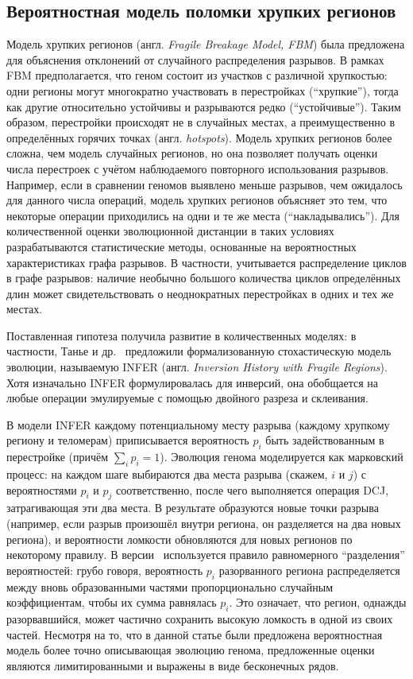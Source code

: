 \subsection{Вероятностная модель поломки хрупких регионов}
\label{subsec:fragile_breakage}

Модель хрупких регионов (англ. \textit{Fragile Breakage Model, FBM}) была предложена для объяснения отклонений от случайного распределения разрывов.
В рамках FBM предполагается, что геном состоит из участков с различной хрупкостью: одни регионы могут многократно участвовать в перестройках (``хрупкие''), тогда как другие относительно устойчивы и разрываются редко (``устойчивые'').
Таким образом, перестройки происходят не в случайных местах, а преимущественно в определённых горячих точках (англ. \textit{hotspots}).
Модель хрупких регионов более сложна, чем модель случайных регионов, но она позволяет получать оценки числа перестроек с учётом наблюдаемого повторного использования разрывов.
Например, если в сравнении геномов выявлено меньше разрывов, чем ожидалось для данного числа операций, модель хрупких регионов объясняет это тем, что некоторые операции приходились на одни и те же места (``накладывались'').
Для количественной оценки эволюционной дистанции в таких условиях разрабатываются статистические методы, основанные на вероятностных характеристиках графа разрывов.
В частности, учитывается распределение циклов в графе разрывов: наличие необычно большого количества циклов определённых длин может свидетельствовать о неоднократных перестройках в одних и тех же местах.


Поставленная гипотеза получила развитие в количественных моделях: в частности, Танье и др.~\cite{tannier2016} предложили формализованную стохастическую модель эволюции, называемую INFER (англ. \textit{Inversion History with Fragile Regions}).
Хотя изначально INFER формулировалась для инверсий, она обобщается на любые операции эмулируемые с помощью двойного разреза и склеивания.

В модели INFER каждому потенциальному месту разрыва (каждому хрупкому региону и теломерам) приписывается вероятность $p_i$ быть задействованным в перестройке (причём $\sum_i p_i = 1$).
Эволюция генома моделируется как марковский процесс: на каждом шаге выбираются два места разрыва (скажем, $i$ и $j$) с вероятностями $p_i$ и $p_j$ соответственно, после чего выполняется операция DCJ, затрагивающая эти два места.
В результате образуются новые точки разрыва (например, если разрыв произошёл внутри региона, он разделяется на два новых региона), и вероятности ломкости обновляются для новых регионов по некоторому правилу.
В версии~\cite{tannier2016} используется правило равномерного ``разделения'' вероятностей: грубо говоря, вероятность $p_i$ разорванного региона распределяется между вновь образованными частями пропорционально случайным коэффициентам, чтобы их сумма равнялась $p_i$.
Это означает, что регион, однажды разорвавшийся, может частично сохранить высокую ломкость в одной из своих частей.
Несмотря на то, что в данной статье были предложена вероятностная модель более точно описывающая эволюцию генома, предложенные оценки являются лимитированными и выражены в виде бесконечных рядов.

